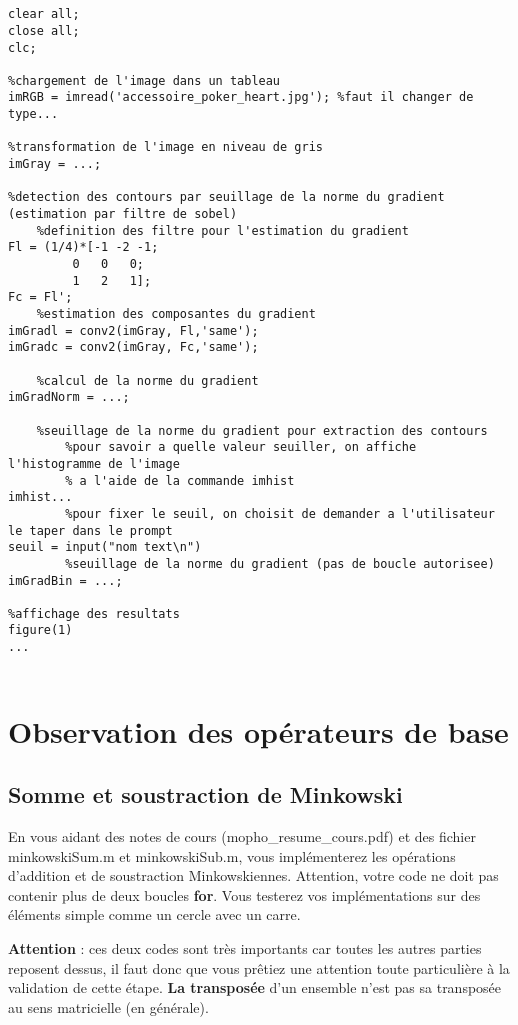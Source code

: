 \documentclass[10pt,a4paper]{article}
\begin{document}
~~

~~
\begin{verbatim}
clear all;
close all;
clc;

%chargement de l'image dans un tableau
imRGB = imread('accessoire_poker_heart.jpg'); %faut il changer de type...

%transformation de l'image en niveau de gris
imGray = ...;

%detection des contours par seuillage de la norme du gradient (estimation par filtre de sobel)
    %definition des filtre pour l'estimation du gradient
Fl = (1/4)*[-1 -2 -1;
         0   0   0;
         1   2   1];
Fc = Fl';
    %estimation des composantes du gradient
imGradl = conv2(imGray, Fl,'same');
imGradc = conv2(imGray, Fc,'same');

    %calcul de la norme du gradient
imGradNorm = ...;

    %seuillage de la norme du gradient pour extraction des contours
        %pour savoir a quelle valeur seuiller, on affiche l'histogramme de l'image
        % a l'aide de la commande imhist
imhist...
        %pour fixer le seuil, on choisit de demander a l'utilisateur le taper dans le prompt
seuil = input("nom text\n")
        %seuillage de la norme du gradient (pas de boucle autorisee)
imGradBin = ...;

%affichage des resultats
figure(1)
...


\end{verbatim}



\clearpage
\section{Observation des op\'{e}rateurs de base}
\subsection{Somme et soustraction de Minkowski}
En vous aidant des notes de cours (mopho\_resume\_cours.pdf) et des fichier minkowskiSum.m et minkowskiSub.m, vous impl\'{e}menterez les op\'{e}rations d'addition et de soustraction Minkowskiennes. Attention, votre code ne doit pas contenir plus de deux boucles \textbf{for}. Vous testerez vos impl\'{e}mentations sur des \'{e}l\'{e}ments simple comme un cercle avec un carre. 

\noindent\textbf{Attention} : ces deux codes sont tr\`{e}s importants car toutes les autres parties reposent dessus, il faut donc que vous pr\^{e}tiez une attention toute particuli\`{e}re \`{a} la validation de cette \'{e}tape.  \textbf{La transpos\'{e}e} d'un ensemble n'est pas sa transpos\'{e}e au sens matricielle (en g\'{e}n\'{e}rale).
\end{document}
